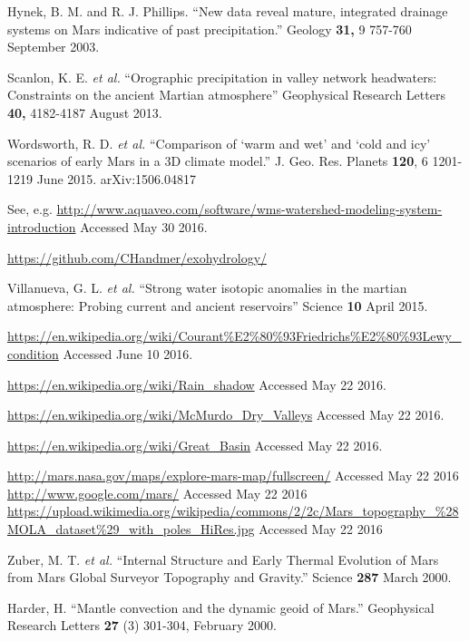 \documentclass[12pt]{iopart}
\numberwithin{equation}{section}
\begin{document}
\begin{thebibliography}{9}
  Hynek, B. M. and R. J. Phillips. ``New data reveal mature, integrated drainage systems on Mars indicative of past precipitation.'' Geology {\bf 31,} 9 757-760 September 2003.

  Scanlon, K. E. {\it et al.} ``Orographic precipitation in valley network headwaters: Constraints on the ancient Martian atmosphere'' Geophysical Research Letters {\bf 40,} 4182-4187 August 2013.

  Wordsworth, R. D. {\it et al.} ``Comparison of `warm and wet' and `cold and icy' scenarios of early Mars in a 3D climate model.'' J. Geo. Res. Planets {\bf 120}, 6 1201-1219 June 2015. arXiv:1506.04817

  See, e.g. \url{http://www.aquaveo.com/software/wms-watershed-modeling-system-introduction} Accessed May 30 2016.

  \url{https://github.com/CHandmer/exohydrology/}

  Villanueva, G. L. {\it et al.} ``Strong water isotopic anomalies in the martian atmosphere: Probing current and ancient reservoirs'' Science {\bf 10} April 2015.

  \url{https://en.wikipedia.org/wiki/Courant%E2%80%93Friedrichs%E2%80%93Lewy_condition} Accessed June 10 2016.

  \url{https://en.wikipedia.org/wiki/Rain_shadow} Accessed May 22 2016.

  \url{https://en.wikipedia.org/wiki/McMurdo_Dry_Valleys} Accessed May 22 2016.

  \url{https://en.wikipedia.org/wiki/Great_Basin} Accessed May 22 2016.

  \url{http://mars.nasa.gov/maps/explore-mars-map/fullscreen/} Accessed May 22 2016 \\
  \url{http://www.google.com/mars/} Accessed May 22 2016 \\
  \url{https://upload.wikimedia.org/wikipedia/commons/2/2c/Mars_topography_\%28MOLA_dataset\%29_with_poles_HiRes.jpg} Accessed May 22 2016 

  Zuber, M. T. {\it et al.} ``Internal Structure and Early Thermal Evolution of Mars from Mars Global Surveyor Topography and Gravity.'' Science {\bf 287} March 2000. 

  Harder, H. ``Mantle convection and the dynamic geoid of Mars.'' Geophysical Research Letters {\bf 27} (3) 301-304, February 2000.


\end{thebibliography}
\end{document}
